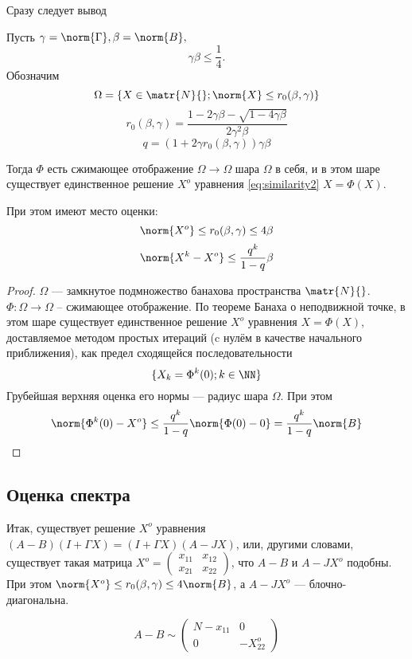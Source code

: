 Сразу следует вывод
\begin{lemma}
    Пусть \( \gamma=\norm{\Gamma}, \beta=\norm{B}, \)
    \[ \gamma\beta\leq\frac14. \]
    Обозначим
    \[ \Omega = \{ X\in\matr{N}{} ; \norm{X}\leq r_0(\beta,\gamma) \} \]
    \[ r_0(\beta,\gamma) = \frac{1 - 2\gamma\beta - \sqrt{1-4\gamma\beta}}{2\gamma^2\beta} \]
    \[ q = (1+2\gamma r_0(\beta,\gamma))\gamma\beta \]

    Тогда \( \Phi \) есть сжимающее отображение \(\Omega\to\Omega\) шара \(\Omega\) в себя,
    и в этом шаре существует единственное решение \( X^o \) уравнения
    \eqref{eq:similarity2} \( X=\Phi(X) \).

    При этом имеют место оценки:
    \[
        \norm{X^o} \leq r_0(\beta,\gamma) \leq 4\beta
        \]
    \[
        \norm{X^k - X^o} \leq \frac{q^k}{1-q}\beta
        \]
\end{lemma}
\begin{proof}
    \( \Omega \) --- замкнутое подмножество банахова пространства \( \matr{N}{} \).
    \( \Phi: \Omega\to\Omega \) -- сжимающее отображение.
    По теореме Банаха о неподвижной точке, в этом шаре существует единственное решение \( X^o \)
    уравнения \( X = \Phi (X) \),
    доставляемое методом простых итераций (c нулём в качестве начального приближения),
    как предел сходящейся последовательности
    \[
        \{X_k = \Phi^k(0); k\in\NN\}
        \]
    Грубейшая верхняя оценка его нормы --- радиус шара \( \Omega \).
    При этом \[ \norm{\Phi^k(0) - X^o} \leq \frac{q^k}{1-q} \norm{\Phi(0) - 0} = \frac{q^k}{1-q}\norm{B} \]
\end{proof}

\subsection{Оценка спектра}
Итак, существует решение \( X^o \) уравнения
\( (A-B)(I+\Gamma X) = (I+\Gamma X)(A-JX) \),
или, другими словами, существует такая матрица
\( X^o =
\begin{pmatrix}
    x_{11} & x_{12} \\
    x_{21} & x_{22}
\end{pmatrix}
\),
что \( A-B \) и \( A - JX^o \) подобны.
При этом \( \norm{X^o} \leq r_0(\beta,\gamma) \leq 4\norm{B} \),
а \( A - JX^o \) --- блочно-диагональна.

\[
    A-B \sim
    \begin{pmatrix}
        N - x_{11} & 0 \\
        0          & -X_{22}^o
    \end{pmatrix}
    \]

